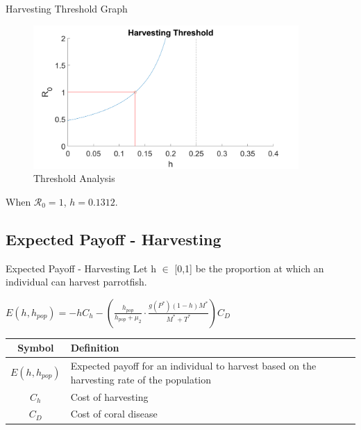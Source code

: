 \documentclass{beamer}
\begin{document}
\begin{frame}{Harvesting Threshold Graph}
    \begin{figure}
        \centering
        \includegraphics[width = 0.9\textwidth]{Latex/Figures/Graphs/threshold_graph.png}
        \caption{Threshold Analysis}
        \label{fig:threshold}
    \end{figure}
    \begin{center}
        When $\mathscr{R}_0 = 1$, $h = 0.1312$.
    \end{center}
\end{frame}

\subsection{Expected Payoff - Harvesting}
\begin{frame}{Expected Payoff - Harvesting}
    Let h $\in$ [0,1] be the proportion at which an individual can harvest parrotfish.
    \begin{center}
    $\displaystyle {E(h, h_{pop}) = -hC_{h} - \left( \frac{h_{pop}}{h_{pop} + \mu_{2}} \cdot \frac{g(P^{*})(1-h)M^{*}}{M^{*} + T^{*}} \right) C_{D}}$ \\
    
    \vspace{0.6cm}
    
    \begin{table}[H]
        \centering
        \begin{tabular}{c|p{8cm}}
             Symbol & Definition \\
             \hline
             $E(h, h_{pop})$ & Expected payoff for an individual to harvest based on the harvesting rate of the population \\
             $C_{h}$ & Cost of harvesting \\
             $C_{D}$ & Cost of coral disease \\
        \end{tabular}
        \label{tab:my_label}
    \end{table}
    \end{center}
\end{frame}
\end{document}
